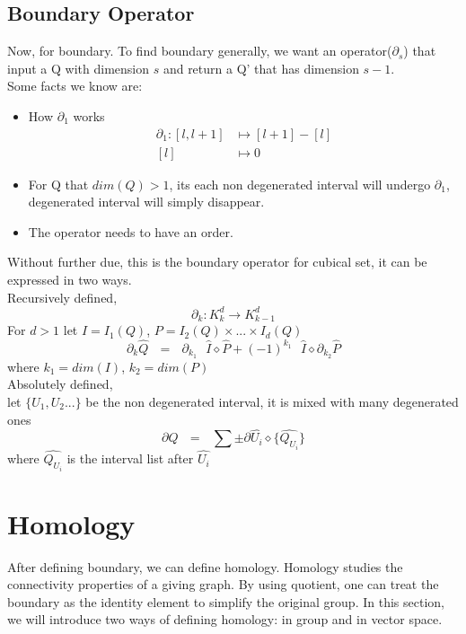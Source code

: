\documentclass[12pt,letterpaper]{article}
\begin{document}
\begin{normalsize}
\subsection{Boundary Operator}
\hspace{5mm} Now, for boundary. To find boundary generally, we want an operator($\partial_s$) that input a Q with dimension $s$ and return a Q' that has dimension $s-1$.\\
Some facts we know are: 
\begin{itemize}
    \item How $\partial_1$ works
            \begin{align*}
        \partial_1\colon  [l,l+1] &\mapsto [l+1] - [l]\\
                         [l] &\mapsto 0 
            \end{align*}
    \item For Q that $dim(Q)>1$, its each non degenerated interval will undergo $\partial_1$, degenerated interval will simply disappear. 
    \item The operator needs to have an order.
\end{itemize}
Without further due, this is the boundary operator for cubical set, it can be expressed in two ways. \\
Recursively defined,
    $$\partial_k \colon K^d_k \longrightarrow K^d_{k-1}$$
For $d>1$ let $I = I_1(Q)$, $P= I_2(Q) \times ... \times I_d(Q)$
$$\partial_k \widehat{Q}\textbf{ } =\textbf{ } \partial_k_1 \textbf{ } \widehat{I} \diamond \widehat{P} + (-1)^{k_1} \textbf{ }\widehat{I} \diamond \partial_k_2 \widehat{P}$$
where $k_1 = dim(I)$, $k_2=dim(P)$ \\[10pt]
Absolutely defined, \\
let $\{U_1,U_2 ...\}$ be the non degenerated interval, it is mixed with many degenerated ones\\
$$\partial \widehat{Q}\textbf{ } =\textbf{ } \sum \pm \partial \widehat{U_i} \diamond \{\widehat{Q_U_i}\} $$
where $\widehat{Q_U_i}$ is the interval list after $\widehat{U_i}$
\newpage
\section{Homology}
\hspace{5mm} After defining boundary, we can define homology. Homology studies the connectivity properties of a giving graph. By using quotient, one can treat the boundary as the identity element to simplify the original group. In this section, we will introduce two ways of defining homology: in group and in vector space. 


\end{normalsize}
\end{document}
